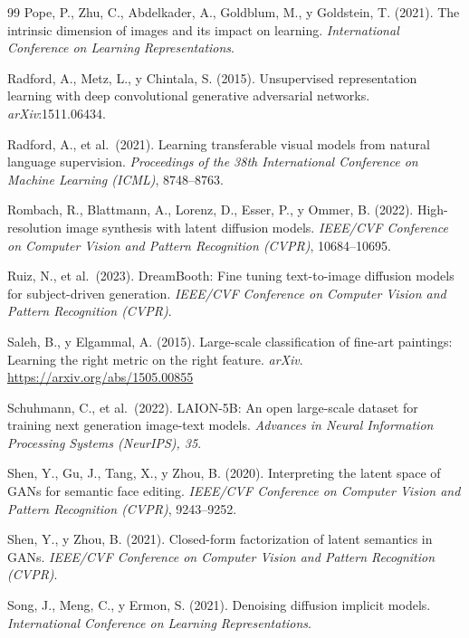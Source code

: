 \documentclass[12pt, a4paper, twoside]{book}
\begin{document}
\begin{thebibliography}{99}
Pope, P., Zhu, C., Abdelkader, A., Goldblum, M., y Goldstein, T. (2021).
The intrinsic dimension of images and its impact on learning.
\textit{International Conference on Learning Representations}.

Radford, A., Metz, L., y Chintala, S. (2015).
Unsupervised representation learning with deep convolutional generative adversarial networks.
\textit{arXiv}:1511.06434.

Radford, A., et al.\ (2021).
Learning transferable visual models from natural language supervision.
\textit{Proceedings of the 38th International Conference on Machine Learning (ICML)}, 8748--8763.

Rombach, R., Blattmann, A., Lorenz, D., Esser, P., y Ommer, B. (2022).
High-resolution image synthesis with latent diffusion models.
\textit{IEEE/CVF Conference on Computer Vision and Pattern Recognition (CVPR)}, 10684--10695.

Ruiz, N., et al.\ (2023).
DreamBooth: Fine tuning text-to-image diffusion models for subject-driven generation.
\textit{IEEE/CVF Conference on Computer Vision and Pattern Recognition (CVPR)}.

Saleh, B., y Elgammal, A. (2015).
Large-scale classification of fine-art paintings: Learning the right metric on the right feature.
\textit{arXiv}. \url{https://arxiv.org/abs/1505.00855}

Schuhmann, C., et al.\ (2022).
LAION-5B: An open large-scale dataset for training next generation image-text models.
\textit{Advances in Neural Information Processing Systems (NeurIPS), 35}.

Shen, Y., Gu, J., Tang, X., y Zhou, B. (2020).
Interpreting the latent space of GANs for semantic face editing.
\textit{IEEE/CVF Conference on Computer Vision and Pattern Recognition (CVPR)}, 9243--9252.

Shen, Y., y Zhou, B. (2021).
Closed-form factorization of latent semantics in GANs.
\textit{IEEE/CVF Conference on Computer Vision and Pattern Recognition (CVPR)}.

Song, J., Meng, C., y Ermon, S. (2021).
Denoising diffusion implicit models.
\textit{International Conference on Learning Representations}.


\end{thebibliography}
\end{document}
